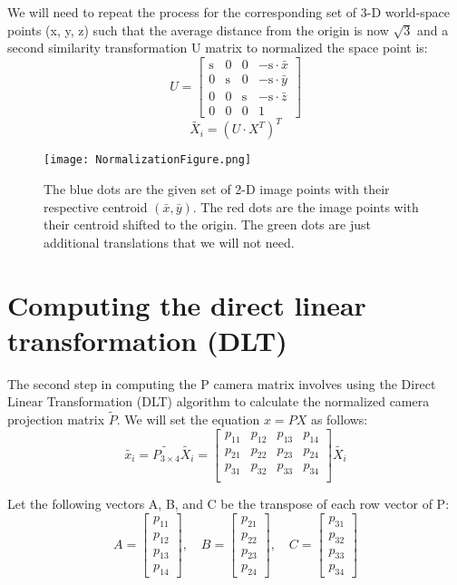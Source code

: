 \documentclass[12pt]{article}
\begin{document}
\noindent We will need to repeat the process for the corresponding set of 3-D world-space points (x, y, z) such that the average distance from the origin is now \( \sqrt{3} \) and a second similarity transformation U matrix to normalized the space point is:
\[
U = \begin{bmatrix}
\text{s} & 0 & 0 & -\text{s} \cdot \bar{x} \\
0 & \text{s} & 0 & -\text{s} \cdot \bar{y} \\
0 & 0 & \text{s} & -\text{s} \cdot \bar{z} \\
0 & 0 & 0 & 1
\end{bmatrix}
\]
\[
\tilde{X_i} = (U \cdot X^T)^T
\]
\newpage

\begin{figure}[ht]
    \centering
    \texttt{[image: NormalizationFigure.png]}
    \caption{The blue dots are the given set of 2-D image points with their respective centroid \( (\bar{x}, \bar{y}) \). The red dots are the image points with their centroid shifted to the origin. The green dots are just additional translations that we will not need. }
\end{figure}

\section{Computing the direct linear transformation (DLT)}

\noindent The second step in computing the P camera matrix involves using the Direct Linear Transformation (DLT) algorithm to calculate the normalized camera projection matrix \( \tilde{P} \). We will set the equation \( x = PX \) as follows:
\[ 
\tilde{x_i} = \tilde{P_{3 \times 4}} \tilde{X_i} = 
\begin{bmatrix}
p_{11} & p_{12} & p_{13} & p_{14} \\
p_{21} & p_{22} & p_{23} & p_{24} \\
p_{31} & p_{32} & p_{33} & p_{34} \\
\end{bmatrix} \tilde{X_i}
\]

\noindent Let the following vectors A, B, and C be the transpose of each row vector of P:
\[ 
A = 
\begin{bmatrix}
p_{11} \\ p_{12} \\ p_{13} \\ p_{14}
\end{bmatrix}
, \quad B = 
\begin{bmatrix}
p_{21} \\ p_{22} \\ p_{23} \\ p_{24}
\end{bmatrix}
, \quad C = 
\begin{bmatrix}
p_{31} \\ p_{32} \\ p_{33} \\ p_{34}
\end{bmatrix}
\]
\end{document}

